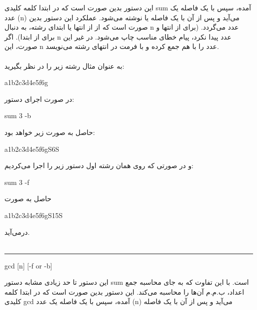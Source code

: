 \documentclass[]{article}
\begin{document}
این دستور بدین صورت است که در ابتدا کلمه کلیدی sum آمده، سپس با یک فاصله یک عدد (n) می‌آید و پس از آن با یک فاصله 
 یا 
 نوشته می‌شود. عملکرد این دستور بدین صورت است که از از انتها یا ابتدای رشته، به دنبال n  عدد می‌گردد. (برای 
  از انتها و برای 
  از ابتدا). اگر n عدد پیدا نکرد، پیام خطای مناسب چاپ می‌شود. در غیر این صورت، این n عدد را با هم جمع کرده و با فرمت
 در انتهای رشته می‌نویسد.\\\\
به عنوان مثال رشته زیر را در نظر بگیرید:
\begin{tcolorbox}[boxrule=0pt]
	\begin{latin}
  	  \large{
		a1b2c3d4e5f6g
		}
	\end{latin}
\end{tcolorbox}
در صورت اجرای دستور:
\begin{tcolorbox}[boxrule=0pt]
	\begin{latin}
  	  \large{
  	  	sum 3 -b
		}
	\end{latin}
\end{tcolorbox}
حاصل به صورت زیر خواهد بود:
\begin{tcolorbox}[boxrule=0pt]
	\begin{latin}
  	  \large{
  	  	a1b2c3d4e5f6gS6S
		}
	\end{latin}
\end{tcolorbox}
و در صورتی که روی همان رشته اول دستور زیر را اجرا می‌کردیم:
\begin{tcolorbox}[boxrule=0pt]
	\begin{latin}
  	  \large{
  	  	sum 3 -f
		}
	\end{latin}
\end{tcolorbox}
حاصل به صورت
\begin{tcolorbox}[boxrule=0pt]
	\begin{latin}
  	  \large{
  	  	a1b2c3d4e5f6gS15S
		}
	\end{latin}
\end{tcolorbox}
در‌می‌آید.\\\\
\noindent\rule[0.5ex]{\linewidth}{1pt}
\begin{tcolorbox}[boxrule=0pt]
	\begin{latin}
  	  \large{
  	  	gcd [n] [-f or -b]
		}
	\end{latin}
\end{tcolorbox}
این دستور تا حد زیادی مشابه دستور sum است. با این تفاوت که به جای محاسبه جمع اعداد، ب.م.م آن‌ها را محاسبه می‌کند. این دستور بدین صورت است که در ابتدا کلمه کلیدی gcd آمده، سپس با یک فاصله یک عدد (n) می‌آید و پس از آن با یک فاصله 
\end{document}
